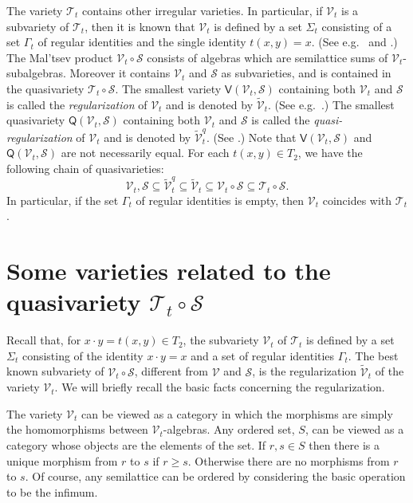 \documentclass{birkau}
\newcommand{\mcV}{\mathcal{V}}
\newcommand{\mcT}{\mathcal{T}}
\newcommand{\mcS}{\mathcal{S}}
\def\tV{\widetilde{\mcV}}
\def\tqV{\widetilde{\mcV}^q}
\theoremstyle{plain}
\theoremstyle{definition}
\numberwithin{equation}{section}
\begin{document}
The variety $\mcT_t$ contains other irregular varieties. In particular, if $\mcV_t$ is a
subvariety of $\mcT_t$, then it is known that $\mcV_t$ is defined by a set
$\Sigma_t$ consisting of a set $\Gamma_t$ of regular identities and the single identity
$t(x,y) = x$. (See e.g.~\cite{PR92} and \cite[Ch.~4]{RS02}.) The Mal'tsev product
$\mcV_t \circ \mcS$ consists of algebras which are semilattice sums of
$\mcV_t$-subalgebras. Moreover it contains $\mcV_t$ and $\mcS$ as subvarieties, and is
contained in the quasivariety $\mcT_t \circ \mcS$. The smallest variety
$\mathsf{V}(\mcV_t, \mcS)$ containing both $\mcV_t$ and $\mcS$ is called the
\emph{regularization} of $\mcV_t$ and is denoted by $\tV_t$.  (See
e.g.~\cite[Ch.~4]{RS02}.) The smallest quasivariety $\mathsf{Q}(\mcV_t, \mcS)$ containing
both $\mcV_t$ and $\mcS$ is called the \emph{quasi-regularization} of $\mcV_t$ and is
denoted by $\tqV_t$. (See \cite{BR96}.)  Note that $\mathsf{V}(\mcV_t, \mcS)$ and
$\mathsf{Q}(\mcV_t, \mcS)$ are not necessarily equal.  For each $t(x,y) \in T_2$, we have
the following chain of quasivarieties:
\begin{equation*}
\mcV_t,  \mcS  \subseteq  \tqV_t \subseteq  \tV_t \subseteq \mcV_t \circ \mcS \subseteq \mcT_t \circ \mcS.
\end{equation*}
In particular, if the set $\Gamma_t$ of regular identities is empty, then $\mcV_t$ coincides with $\mcT_t$.


\section{Some varieties related to the quasivariety $\mcT_t \circ \mcS$}\label{S:subvarieties}

Recall that, for $x \cdot y = t(x,y) \in T_2$, the subvariety $\mcV_t$ of $\mcT_t$ is defined by a set $\Sigma_t$ consisting of the identity $x \cdot y = x$ and a set of regular identities $\Gamma_t$. The best known subvariety of $\mcV_t \circ \mcS$, different from $\mcV$ and $\mcS$,  is the regularization $\tV_t$ of the variety $\mcV_t$.
We will briefly recall the basic facts concerning the regularization.

The variety $\mcV_t$ can be viewed as a category in which the morphisms are simply the
homomorphisms between $\mcV_t$-algebras. Any ordered set, $S$, can be viewed as a category
whose objects are the elements of the set. If $r, s \in S$ then there is a unique morphism
from $r$ to $s$ if $r\geq s$. Otherwise there are no morphisms from $r$ to $s$. Of course,
 any semilattice can be ordered by considering the basic operation to be the infimum.
\end{document}
